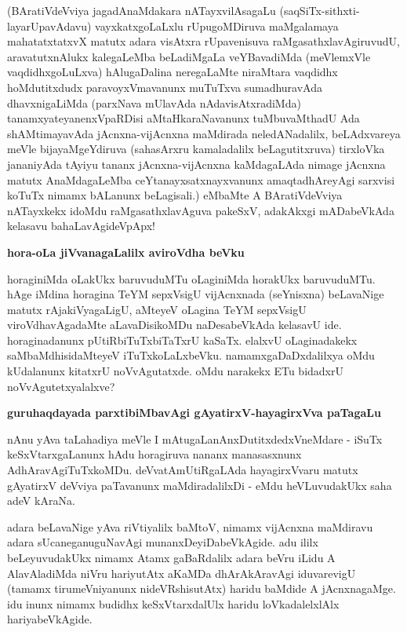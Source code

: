 \noindent
(BAratiVdeVviya jagadAnaMdakara nATayxvilAsagaLu (saqSiTx-sithxti-layarUpa\break\-vAdavu) vayxkatx\-goLaLxlu rUpugoMDiruva maMgalamaya mahatatxtatxvX matutx adara visAtxra rUpavenisuva raMgasathxlavAgiru\-vudU, aravatutxnAlukx kalegaLeMba beLa\-diMgaLa veYBavadiMda (meVlemxVle vaqdidhxgoLuLxva) hAlu\-gaDa\-lina neregaLaMte niraMtara vaqdidhx hoMdutitxdudx paravoyxVmavanunx muTuTxva sumadhuravAda dhavxnigaLiMda (parxNava mUla\-vAda nAdavisAtxradiMda) tanamxyateyanenxVpaRDisi aMtaHkaraNavanunx tuMbuvaMthadU Ada shAMtimaya\-vAda jAcnxna-vijAcnxna maMdirada neledANadalilx, beLAdxvareya meVle bijayaMgeYdiruva (saha\-sArxru kamala\-dalilx beLagutitxruva) tirxloVka jananiyAda tAyiyu tananx jAcnxna-vijAcnxna kaMda\-gaLAda nimage jAcnxna matutx AnaMdagaLeMba ceYtanayxsatxnayxvanunx amaqtadhAreyAgi sarxvisi koTuTx nimamx bALanunx beLagisali.) eMbaMte A BAratiVdeVviya nATayxkekx idoMdu raMgasathxlavAguva pakeSxV, adakAkxgi mADabeVkAda kelasavu bahaLa\-vAgideVpApx!

{\bigskip
\noindent
{\large\bf hora-oLa jiVvanagaLalilx aviroVdha beVku}}\label{page201}
\medskip

\noindent
horaginiMda oLakUkx baruvuduMTu oLaginiMda horakUkx baruvuduMTu. hAge iMdina horagina TeYM sepxVsigU vijAcnxnada (seYnisxna) beLavaNige matutx rAjakiVya\-gaLigU, aMteyeV oLagina TeYM sepxVsigU viroVdhavAgadaMte aLavaDisikoMDu naDesabeVkAda kelasavU ide. horaginadanunx pUtiRbiTuTxbiTaTxrU kaSaTx. elalxvU oLaginadakekx saMbaMdhisidaMteyeV iTuTxkoLaLxbeVku. namamxgaDaDxdalilxya oMdu kUdalanunx kitatxrU noVvAgutatxde. oMdu narakekx ETu bidadxrU noVvAgutetxyalalxve?

{\bigskip
\noindent
{\large\bf guruhaqdayada parxtibiMbavAgi gAyatirxV-hayagirxVva paTagaLu}}\label{page76}
\medskip

\noindent
nAnu yAva taLahadiya meVle I mAtugaLanAnxDutitxdedxVneMdare - iSuTx keSxVtarx\-gaLanunx hAdu hora\-giruva nananx manasasxnunx AdhAravAgiTuTxkoMDu. deVvatA\-mUtiRgaLAda hayagirxVvaru matutx gAyatirxV deVviya paTavanunx maMdiradalilxDi - eMdu heVLuvudakUkx saha adeV kAraNa.

adara beLavaNige yAva riVtiyalilx baMtoV, nimamx vijAcnxna maMdiravu adara sUcaneganuguNa\-vAgi munanxDeyiDabeVkAgide. adu ililx beLeyuvudakUkx nimamx Atamx gaBaRdalilx adara beVru iLidu A Ala\-vAladiMda niVru hariyutAtx aKaMDa dhArAkAravAgi iduvarevigU (tamamx tirumeVniyanunx nideVR\-shisutAtx) haridu baMdide A jAcnxnagaMge. idu inunx nimamx budidhx keSxVtarxdalUlx haridu loVkadalelxlAlx hariyabeVkAgide.


